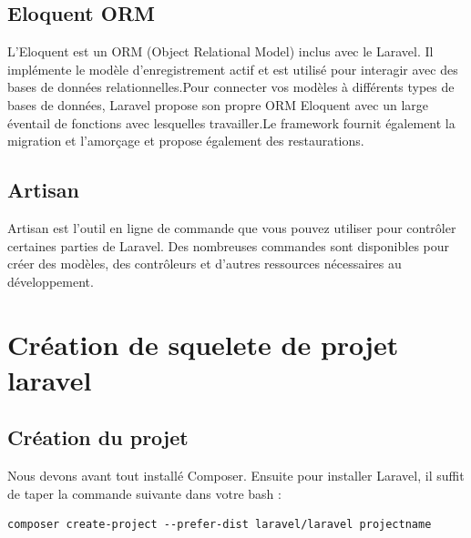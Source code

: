 \subsection{  Eloquent ORM}
L'Eloquent est un ORM (Object Relational Model) inclus avec le Laravel. Il implémente le modèle d'enregistrement actif et est utilisé pour interagir avec des bases de données relationnelles.Pour connecter vos modèles à différents types de bases de données, Laravel propose son propre
ORM Eloquent avec un large éventail de fonctions avec lesquelles travailler.Le framework fournit également la migration et l'amorçage et propose également des restaurations.


\subsection{Artisan}
Artisan est l'outil en ligne de commande que vous pouvez utiliser pour contrôler certaines parties
de Laravel. Des nombreuses commandes sont disponibles pour créer des modèles, des contrôleurs et d'autres ressources nécessaires au développement.

\section{Création de squelete de projet laravel }
\subsection{Création du projet}
Nous devons avant tout installé Composer.
Ensuite pour installer Laravel, il suffit de taper la commande suivante dans votre bash :

\begin{verbatim}
composer create-project --prefer-dist laravel/laravel projectname
\end{verbatim}



